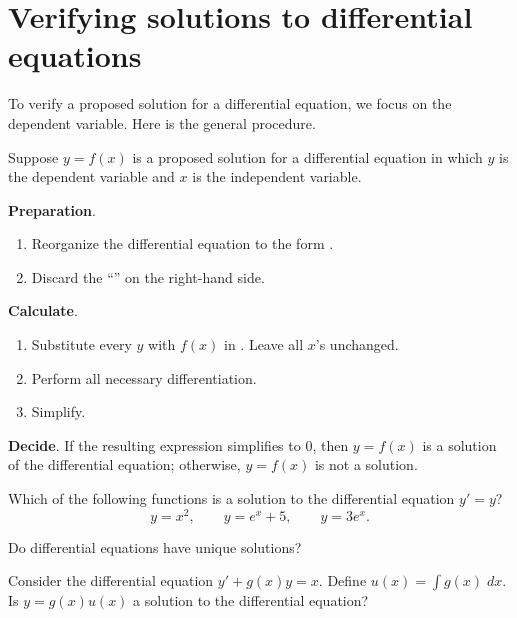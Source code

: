 \documentclass[../main.tex]{subfiles}
\begin{document}
 \section{Verifying solutions to differential equations}

To verify a proposed solution for a differential equation, we focus on the dependent variable. Here is the general procedure. 

\begin{mdframed}[style=simple-compact]
  Suppose \(y = f(x)\) is a proposed solution for a differential equation in which \(y\) is the dependent variable and \(x\) is the independent variable. 

  \textbf{Preparation}.
  \begin{enumerate}
    \item Reorganize the differential equation to the form .
    \item Discard the ``'' on the right-hand side. 
  \end{enumerate}

  \textbf{Calculate}.
  \begin{enumerate}
    \item Substitute every \(y\) with \(f(x)\) in . Leave all \(x\)'s unchanged.
    \item Perform all necessary differentiation. 
    \item Simplify.
  \end{enumerate} 

  \textbf{Decide}. If the resulting expression simplifies to \(0\), then \(y = f(x)\) is a solution of the differential equation; otherwise, \(y = f(x)\) is not a solution.
\end{mdframed}

\begin{example}
  Which of the following functions is a solution to the differential equation \(y' = y\)?
  \[
    y = x^{2}, \qquad y = e^{x} + 5, \qquad y = 3e^{x}.
  \]

\end{example}

\faComment{} Do differential equations have unique solutions?
\clearpage

\begin{example}
  Consider the differential equation \(y' + g(x) y = x\). Define \(u(x) = \int g(x) \;dx\). Is \(y = g(x)u(x)\) a solution to the differential equation?

\end{example}
\clearpage
\end{document}
